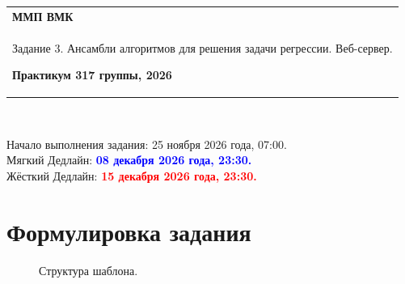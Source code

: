 \documentclass[10pt,fleqn]{article}
\begin{document}
\begin{center}
    \begin{tabular}{|p{17.5cm}|}
        \hline
        \textbf{ММП ВМК}\\
        \begin{center} \Large Задание 3. Ансамбли алгоритмов для решения задачи регрессии. Веб-сервер. \end{center}
        \textbf{Практикум 317 группы, 2026}\\
        \hline
    \end{tabular}
\end{center}

\

\begin{tabbing}
    Начало выполнения задания: 25 ноября 2026 года, 07:00.\\
    Мягкий Дедлайн: \textcolor{blue}{\bf 08 декабря 2026 года, 23:30.} \\
    Жёсткий Дедлайн: \textcolor{red}{\bf 15 декабря 2026 года, 23:30.}
\end{tabbing}

\section*{Формулировка задания}

\begin{figure}
    \begin{center}
        \begin{minipage}[b]{0.8\textwidth}
            \renewcommand*\DTstylecomment{\color{blue}}
            \renewcommand*\DTstyle{\ttfamily\textcolor{red}}
        \end{minipage}
    \end{center}
    \caption{\label{fig:ensembles}Структура шаблона.}
\end{figure}
\end{document}
